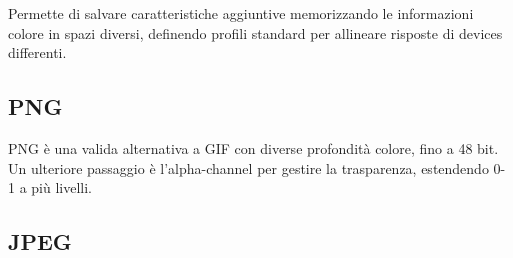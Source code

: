 Permette di salvare caratteristiche aggiuntive memorizzando le informazioni colore in spazi diversi, definendo profili standard per allineare risposte di devices differenti.

 \subsection{PNG}
 PNG è una valida alternativa a GIF con diverse profondità colore, fino a 48 bit. Un ulteriore passaggio è l'alpha-channel per gestire la trasparenza, estendendo 0-1 a più livelli. 
 
 \subsection{JPEG}